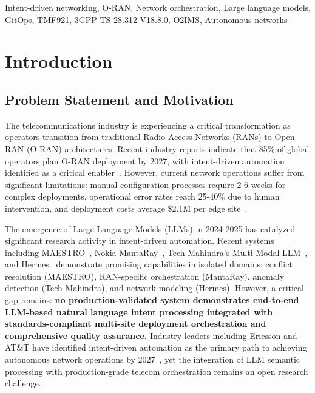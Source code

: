 \documentclass[conference]{IEEEtran}
\begin{document}
\begin{IEEEkeywords}
Intent-driven networking, O-RAN, Network orchestration, Large language models, GitOps, TMF921, 3GPP TS 28.312 V18.8.0, O2IMS, Autonomous networks
\end{IEEEkeywords}


\section{Introduction}

\subsection{Problem Statement and Motivation}

The telecommunications industry is experiencing a critical transformation as operators transition from traditional Radio Access Networks (RANs) to Open RAN (O-RAN) architectures. Recent industry reports indicate that 85\% of global operators plan O-RAN deployment by 2027, with intent-driven automation identified as a critical enabler~\cite{ericsson_intent2024}. However, current network operations suffer from significant limitations: manual configuration processes require 2-6 weeks for complex deployments, operational error rates reach 25-40\% due to human intervention, and deployment costs average \$2.1M per edge site~\cite{tmforum_intent_api}.

The emergence of Large Language Models (LLMs) in 2024-2025 has catalyzed significant research activity in intent-driven automation. Recent systems including MAESTRO~\cite{maestro2025}, Nokia MantaRay~\cite{nokia_mantaray2025}, Tech Mahindra's Multi-Modal LLM~\cite{techmahindra_llm2025}, and Hermes~\cite{hermes2024} demonstrate promising capabilities in isolated domains: conflict resolution (MAESTRO), RAN-specific orchestration (MantaRay), anomaly detection (Tech Mahindra), and network modeling (Hermes). However, a critical gap remains: \textbf{no production-validated system demonstrates end-to-end LLM-based natural language intent processing integrated with standards-compliant multi-site deployment orchestration and comprehensive quality assurance.} Industry leaders including Ericsson and AT\&T have identified intent-driven automation as the primary path to achieving autonomous network operations by 2027~\cite{att_ericsson2024}, yet the integration of LLM semantic processing with production-grade telecom orchestration remains an open research challenge.
\end{document}
